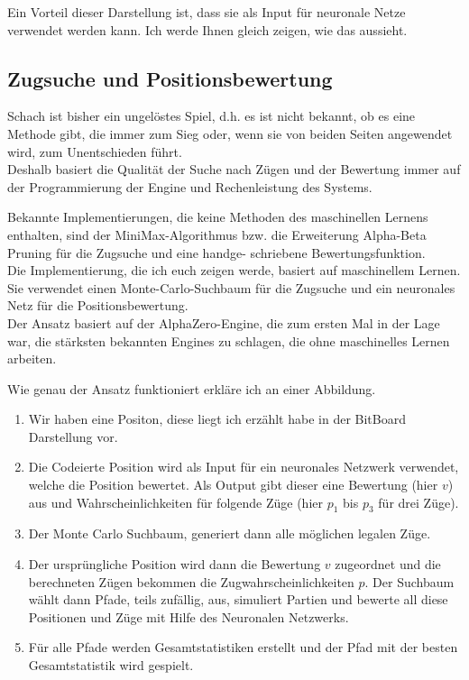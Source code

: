 Ein Vorteil dieser Darstellung ist, dass sie als Input für neuronale Netze verwendet werden kann. Ich werde Ihnen gleich zeigen, wie das aussieht.

\newpage

\subsection{Zugsuche und Positionsbewertung}

Schach ist bisher ein ungelöstes Spiel, d.h. es ist nicht bekannt, ob es eine Methode gibt, die immer zum Sieg oder, wenn sie von beiden Seiten angewendet wird, zum Unentschieden führt.\\

Deshalb basiert die Qualität der Suche nach Zügen und der Bewertung immer auf der Programmierung der Engine und Rechenleistung des Systems.

Bekannte Implementierungen, die keine Methoden des maschinellen Lernens enthalten, sind der MiniMax-Algorithmus bzw. die Erweiterung Alpha-Beta Pruning für die Zugsuche und eine handge-
schriebene Bewertungsfunktion.\\

Die Implementierung, die ich euch zeigen werde, basiert auf maschinellem Lernen. Sie verwendet einen Monte-Carlo-Suchbaum für die Zugsuche und ein neuronales Netz für die Positionsbewertung.\\

Der Ansatz basiert auf der AlphaZero-Engine, die zum ersten Mal in der Lage war, die stärksten bekannten Engines zu schlagen, die ohne maschinelles Lernen arbeiten.

\newpage

Wie genau der Ansatz funktioniert erkläre ich an einer Abbildung.

\begin{enumerate}[leftmargin=*]
\item Wir haben eine Positon, diese liegt ich erzählt habe in der BitBoard Darstellung vor.
\item Die Codeierte Position wird als Input für ein neuronales Netzwerk verwendet, welche die Position bewertet. Als Output gibt dieser eine Bewertung (hier $v$) aus und Wahrscheinlichkeiten für folgende Züge (hier $p_1$ bis $p_3$ für drei Züge).
\item Der Monte Carlo Suchbaum, generiert dann alle möglichen legalen Züge.
\item Der ursprüngliche Position wird dann die Bewertung $v$ zugeordnet und die berechneten Zügen bekommen die Zugwahrscheinlichkeiten $p$. Der Suchbaum wählt dann Pfade, teils zufällig, aus, simuliert Partien und bewerte all diese Positionen und Züge mit Hilfe des Neuronalen Netzwerks.
\item Für alle Pfade werden Gesamtstatistiken erstellt und der Pfad mit der besten Gesamtstatistik wird gespielt.
\end{enumerate}

